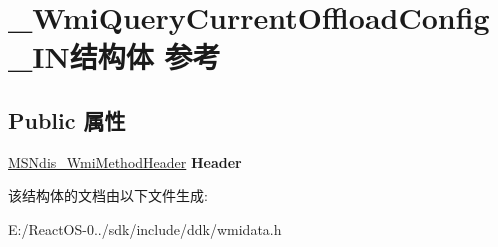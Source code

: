 \hypertarget{struct___wmi_query_current_offload_config___i_n}{}\section{\+\_\+\+Wmi\+Query\+Current\+Offload\+Config\+\_\+\+I\+N结构体 参考}
\label{struct___wmi_query_current_offload_config___i_n}
\subsection*{Public 属性}
\begin{DoxyCompactItemize}
\item 
\mbox{\label{struct___wmi_query_current_offload_config___i_n_a62d937d080460980f845fa853716ee0d}} 
\hyperlink{struct___m_s_ndis___wmi_method_header}{M\+S\+Ndis\+\_\+\+Wmi\+Method\+Header} {\bfseries Header}
\end{DoxyCompactItemize}


该结构体的文档由以下文件生成\+:\begin{DoxyCompactItemize}
\item 
E\+:/\+React\+O\+S-\/0../sdk/include/ddk/wmidata.\+h\end{DoxyCompactItemize}
